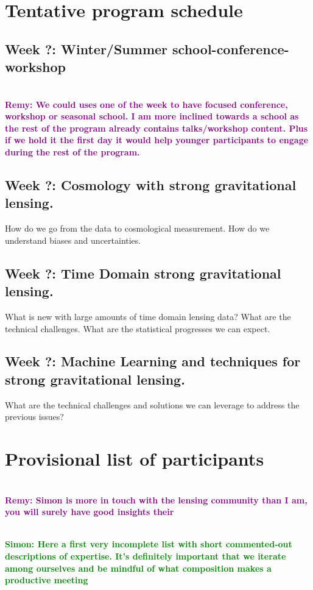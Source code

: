 \documentclass[11pt, letterpaper]{article}
\newcommand{\notesRemy}[1]{\textcolor{purple}{\bf \\  Remy: #1}}
\newcommand{\notesSimon}[1]{\textcolor{green}{\bf \\ Simon: #1}}
\begin{document}
\section{Tentative program schedule}

    \subsection{Week ?: Winter/Summer school-conference-workshop}
        \notesRemy{We could uses one of the week to have focused conference, workshop or seasonal school. I am more inclined towards a school as the rest of the program already contains talks/workshop content. Plus if we hold it the first day it would help younger participants to engage during the rest of the program.}
    
    \subsection{Week ?: Cosmology with strong gravitational lensing.}
        How do we go from the data to cosmological measurement. How do we understand biases and uncertainties.
    \subsection{Week ?: Time Domain strong gravitational lensing.}
        What is new with large amounts of time domain lensing data? What are the technical challenges. What are the statistical progresses we can expect.
    \subsection{Week ?: Machine Learning and techniques for strong gravitational lensing.}
        What are the technical challenges and solutions we can leverage to address the previous issues?

\section{Provisional list of participants}

\notesRemy{Simon is more in touch with the lensing community than I am, you will surely have good insights their}

\notesSimon{Here a first very incomplete list with short commented-out descriptions of expertise. It's definitely important that we iterate among ourselves and be mindful of what composition makes a productive meeting}
\end{document}
